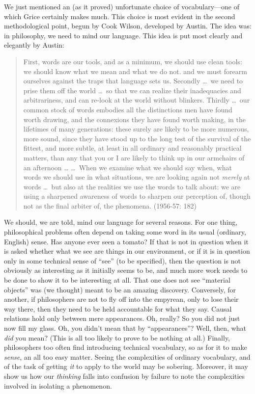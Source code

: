 We just mentioned an (as it proved) unfortunate choice of vocabulary---one of which Grice certainly makes much. This choice is most evident in the second methodological point, begun by Cook Wilson, developed by Austin. The idea was: in philosophy, we need to mind our language. This idea is put most clearly and elegantly by Austin:
\begin{quote}
	First, words are our tools, and as a minimum, we should use clean tools: we should know what we mean and what we do not. and we must forearm ourselves against the traps that language sets us. Secondly \ldots\ we need to prise them off the world \ldots\ so that we can realize their inadequacies and arbitrariness, and can re-look at the world without blinkers. Thirdly \ldots\ our common stock of words embodies all the distinctions men have found worth drawing, and the connexions they have found worth making, in the lifetimes of many generations: these surely are likely to be more numerous, more sound, since they have stood up to the long test of the survival of the fittest, and more subtle, at least in all ordinary and reasonably practical matters, than any that you or I are likely to think up in our armchairs of an afternoon \ldots
	\ldots\ When we examine what we should say when, what words we should use in what situations, we are looking again not \emph{merely} at words \ldots\ but also at the realities we use the words to talk about: we are using a sharpened awareness of words to sharpen our perception of, though not as the final arbiter of, the phenomena. (1956-57: 182)
\end{quote}
We should, we are told, mind our language for several reasons. For one thing, philosophical problems often depend on taking some word in its usual (ordinary, English) sense. Has anyone ever seen a tomato? If that is not in question when it is asked whether what we see are things in our environment, or if it is in question only in some technical sense of ``see'' (to be specified), then the question is not obviously as interesting as it initially seems to be, and much more work needs to be done to show it to be interesting at all. That one does not see ``material objects'' was (we thought) meant to be an amazing discovery. Conversely, for another, if philosophers are not to fly off into the empyrean, only to lose their way there, then they need to be held accountable for what they say. Causal relations hold only between mere appearances. Oh, really? So you did not just now fill my glass. Oh, you didn't mean that by ``appearances''? Well, then, what \emph{did} you mean? (This is all too likely to prove to be nothing at all.) Finally, philosophers too often find introducing technical vocabulary, so as for it to make \emph{sense}, an all too easy matter. Seeing the complexities of ordinary vocabulary, and of the task of getting \emph{it} to apply to the world may be sobering. Moreover, it may show us how our \emph{thinking} falls into confusion by failure to note the complexities involved in isolating a phenomenon.

